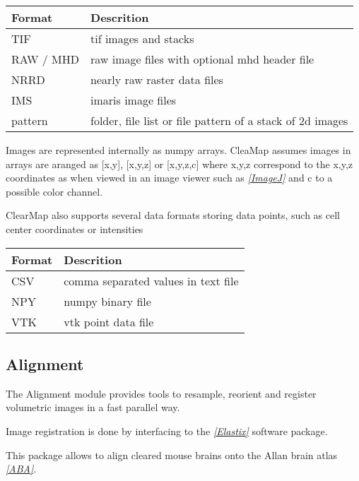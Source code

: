\documentclass[letterpaper,10pt,english]{sphinxmanual}
\begin{document}
\begin{tabulary}{\linewidth}{|L|L|}
\hline
\textsf{\relax 
Format
} & \textsf{\relax 
Descrition
}\\
\hline
TIF
 & 
tif images and stacks
\\
\hline
RAW / MHD
 & 
raw image files with optional mhd header file
\\
\hline
NRRD
 & 
nearly raw raster data files
\\
\hline
IMS
 & 
imaris image files
\\
\hline
pattern
 & 
folder, file list or file pattern of a stack of 2d images
\\
\hline\end{tabulary}


Images are represented internally as numpy arrays. CleaMap assumes images
in arrays are aranged as {[}x,y{]}, {[}x,y,z{]} or {[}x,y,z,c{]} where x,y,z correspond to
the x,y,z coordinates as when viewed in an image viewer such as \label{introduction:id1}{\hyperref[introduction:imagej]{\emph{{[}ImageJ{]}}}} and
c to a possible color channel.

ClearMap also supports several data formats storing data points, such as
cell center coordinates or intensities

\begin{tabulary}{\linewidth}{|L|L|}
\hline
\textsf{\relax 
Format
} & \textsf{\relax 
Descrition
}\\
\hline
CSV
 & 
comma separated values in text file
\\
\hline
NPY
 & 
numpy binary file
\\
\hline
VTK
 & 
vtk point data file
\\
\hline\end{tabulary}



\subsection{Alignment}
\label{introduction:alignment}
The Alignment module provides tools to resample, reorient and register
volumetric images in a fast parallel way.

Image registration is done by interfacing to the \label{introduction:id2}{\hyperref[introduction:elastix]{\emph{{[}Elastix{]}}}} software package.

This package allows to align cleared mouse brains onto the Allan brain atlas \label{introduction:id3}{\hyperref[introduction:aba]{\emph{{[}ABA{]}}}}.
\end{document}
